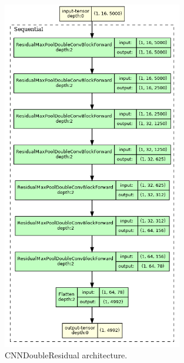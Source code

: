 \documentclass[a4paper,10pt]{article}
\begin{document}
\begin{figure}[p]
	\centering
	\includegraphics[width=0.7\textwidth]{CNNDoubleResidual.gv.png}
	\caption{CNNDoubleResidual architecture.}
	\label{fig:cnnfw_architecture}
\end{figure}
\end{document}
